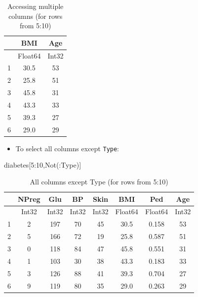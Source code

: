 \documentclass[
  letterpaper,
]{book}
\newenvironment{Shaded}{\begin{snugshade}}{\end{snugshade}}
\newcommand{\DataTypeTok}[1]{\textcolor[rgb]{0.68,0.00,0.00}{#1}}
\newcommand{\FloatTok}[1]{\textcolor[rgb]{0.68,0.00,0.00}{#1}}
\newcommand{\FunctionTok}[1]{\textcolor[rgb]{0.28,0.35,0.67}{#1}}
\newcommand{\NormalTok}[1]{\textcolor[rgb]{0.00,0.23,0.31}{#1}}
\newcommand{\OperatorTok}[1]{\textcolor[rgb]{0.37,0.37,0.37}{#1}}
\providecommand{\tightlist}{%
  \setlength{\itemsep}{0pt}\setlength{\parskip}{0pt}}\usepackage{longtable,booktabs,array}
\begin{document}
\begin{table}
\caption{Accessing multiple columns (for rows from 5:10)}

\centering
\begin{tabular}{r|cc}
    & BMI & Age\\
    \hline
    & Float64 & Int32\\
    \hline
    1 & 30.5 & 53 \\
    2 & 25.8 & 51 \\
    3 & 45.8 & 31 \\
    4 & 43.3 & 33 \\
    5 & 39.3 & 27 \\
    6 & 29.0 & 29 \\
\end{tabular}
\end{table}

\begin{itemize}
\tightlist
\item
  To select all columns except \texttt{Type}:
\end{itemize}

\begin{Shaded}
\begin{Highlighting}[]
\NormalTok{diabetes[}\FloatTok{5}\OperatorTok{:}\FloatTok{10}\NormalTok{,}\FunctionTok{Not}\NormalTok{(}\OperatorTok{:}\DataTypeTok{Type}\NormalTok{)]}
\end{Highlighting}
\end{Shaded}

\begin{table}
\caption{All columns except Type (for rows from 5:10)}

\centering
\begin{tabular}{r|ccccccc}
    & NPreg & Glu & BP & Skin & BMI & Ped & Age\\
    \hline
    & Int32 & Int32 & Int32 & Int32 & Float64 & Float64 & Int32\\
    \hline
    1 & 2 & 197 & 70 & 45 & 30.5 & 0.158 & 53 \\
    2 & 5 & 166 & 72 & 19 & 25.8 & 0.587 & 51 \\
    3 & 0 & 118 & 84 & 47 & 45.8 & 0.551 & 31 \\
    4 & 1 & 103 & 30 & 38 & 43.3 & 0.183 & 33 \\
    5 & 3 & 126 & 88 & 41 & 39.3 & 0.704 & 27 \\
    6 & 9 & 119 & 80 & 35 & 29.0 & 0.263 & 29 \\
\end{tabular}
\end{table}
\end{document}
